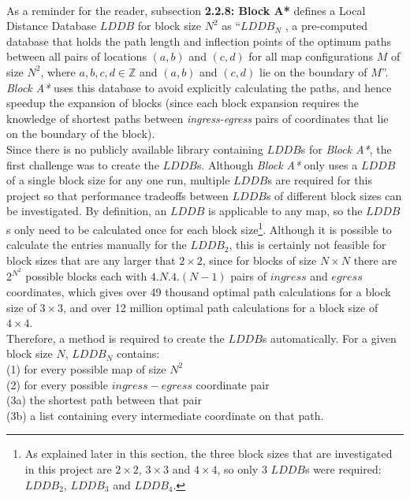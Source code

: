 \documentclass[12pt,notitlepage]{report}
\begin{document}
\\
\noindent
As a reminder for the reader, subsection {\bfseries 2.2.8: Block A*} defines a Local Distance Database $LDDB$ for block size $N^{2}$ as ``$LDDB_{N}$ , a pre-computed database that holds the path length and inflection points of the optimum paths between all pairs of locations $(a,b)$ and $(c,d)$ for all map configurations $M$ of size $N^{2}$, where $a,b,c,d \in \mathbb{Z}$ and $(a,b)$ and $(c,d)$ lie on the boundary of $M$''. {\em Block A*} uses this database to avoid explicitly calculating the paths, and hence speedup the expansion of blocks (since each block expansion requires the knowledge of shortest paths between {\em ingress-egress} pairs of coordinates that lie on the boundary of the block).\\

\noindent
Since there is no publicly available library containing $LDDB$s for {\em Block A*}, the first challenge was to create the $LDDB$s. Although {\em Block A*} only uses a $LDDB$ of a single block size for any one run, multiple $LDDB$s are required for this project so that performance tradeoffs between $LDDB$s of different block sizes can be investigated. By definition, an $LDDB$ is applicable to any map, so the $LDDB$s only need to be calculated once for each block size\footnote{As explained later in this section, the three block sizes that are investigated in this project are $2 \times 2$, $3 \times 3$ and $4 \times 4$, so only 3 $LDDB$s were required: $LDDB_{2}$, $LDDB_{3}$ and $LDDB_{4}$.}. Although it is possible to calculate the entries manually for the $LDDB_{2}$, this is certainly not feasible for block sizes that are any larger that $2 \times 2$, since for blocks of size {$N \times N$} there are $2^{N^{2}}$ possible blocks each with $4.N.4.(N-1)$ pairs of $ingress$ and $egress$ coordinates, which gives over 49 thousand optimal path calculations for a block size of $3 \times 3$, and over 12 million optimal path calculations for a block size of $4 \times 4$.\\

\noindent
Therefore, a method is required to create the $LDDB$s automatically. For a given block size $N$, $LDDB_{N}$ contains:\\
(1) \indent for every possible map of size $N^{2}$\\
(2) \indent \indent for every possible $ingress-egress$ coordinate pair\\
(3a) \indent \indent \indent the shortest path between that pair\\
(3b) \indent \indent \indent a list containing every intermediate coordinate on that path.\\
\end{document}
